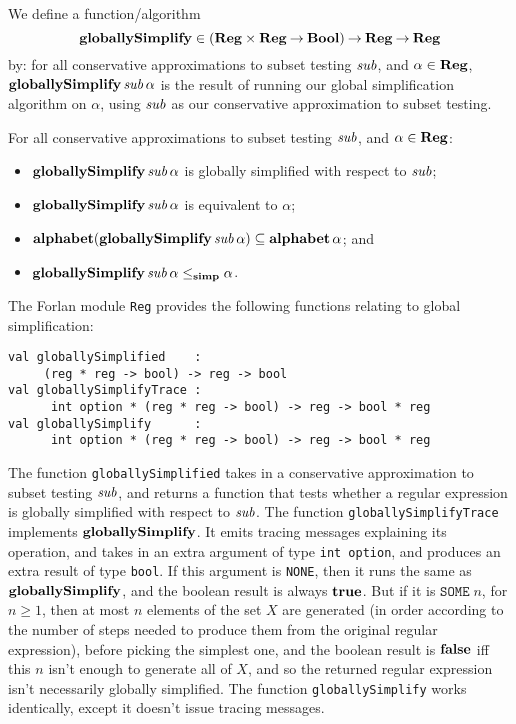 We define a function/algorithm
%
\begin{displaymath}
\mathbf{globallySimplify}\in(\mathbf{Reg}\times\mathbf{Reg}\mathbin{\to}\mathbf{Bool})\mathbin{\to}\mathbf{Reg}\mathbin{\to}\mathbf{Reg} 
\end{displaymath}
by: for all conservative approximations to subset testing ${\it sub}$, and
$\alpha\in\mathbf{Reg}$, $\mathbf{globallySimplify}\,{\it sub}\,\alpha$ is the result
of running our global simplification algorithm on $\alpha$, using
${\it sub}$ as our conservative approximation to subset testing.

\begin{theorem}
For all conservative approximations to subset testing ${\it sub}$, and
$\alpha\in\mathbf{Reg}$:
\begin{itemize}
\item $\mathbf{globallySimplify}\,{\it sub}\,\alpha$ is globally simplified with
  respect to ${\it sub}$;

\item $\mathbf{globallySimplify}\,{\it sub}\,\alpha$ is equivalent to $\alpha$;

\item $\mathbf{alphabet}(\mathbf{globallySimplify}\,{\it sub}\,\alpha)\subseteq\mathbf{alphabet}\,\alpha$;
  and

\item $\mathbf{globallySimplify}\,{\it sub}\,\alpha\mathrel{\leq_{\mathbf{simp}}}\alpha$.
\end{itemize}
\end{theorem}

The Forlan module \texttt{Reg} provides the following functions
relating to global simplification:
\begin{verbatim}
val globallySimplified    :
     (reg * reg -> bool) -> reg -> bool
val globallySimplifyTrace :
      int option * (reg * reg -> bool) -> reg -> bool * reg
val globallySimplify      :
      int option * (reg * reg -> bool) -> reg -> bool * reg
\end{verbatim}
%
%
%

The function \texttt{globallySimplified} takes in a conservative
approximation to subset testing ${\it sub}$, and returns a function that
tests whether a regular expression is globally simplified with respect
to ${\it sub}$.  The function \texttt{globallySimplifyTrace} implements
$\mathbf{globallySimplify}$.  It emits tracing messages explaining its
operation, and takes in an extra argument of type \texttt{int~option},
and produces an extra result of type \texttt{bool}.  If this argument
is \texttt{NONE}, then it runs the same as $\mathbf{globallySimplify}$, and
the boolean result is always $\mathbf{true}$.  But if it is
$\mathtt{SOME}\;n$, for $n\geq 1$, then at most $n$ elements of the
set $X$ are generated (in order according to the number of steps
needed to produce them from the original regular expression), before
picking the simplest one, and the boolean result is $\mathbf{false}$ iff this
$n$ isn't enough to generate all of $X$, and so the returned regular
expression isn't necessarily globally simplified.  The function
\texttt{globallySimplify} works identically, except it doesn't issue
tracing messages.

